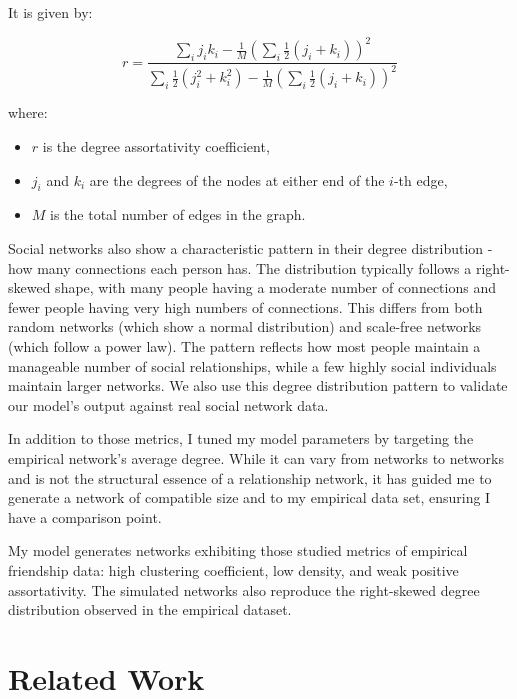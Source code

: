\documentclass[runningheads]{llncs}
\begin{document}
It is given by:

\begin{equation}
r = \frac{\sum_{i} j_i k_i - \frac{1}{M} \left( \sum_{i} \frac{1}{2} (j_i + k_i) \right)^2}{\sum_{i} \frac{1}{2} (j_i^2 + k_i^2) - \frac{1}{M} \left( \sum_{i} \frac{1}{2} (j_i + k_i) \right)^2}
\label{eq:degree_assortativity}
\end{equation}

where:
\begin{itemize}
    \item $r$ is the degree assortativity coefficient,
    \item $j_i$ and $k_i$ are the degrees of the nodes at either end of the $i$-th edge,
    \item $M$ is the total number of edges in the graph.
\end{itemize}


Social networks also show a characteristic pattern in their degree distribution - how many connections each person has. The distribution typically follows a right-skewed shape, with many people having a moderate number of connections and fewer people having very high numbers of connections. This differs from both random networks (which show a normal distribution) and scale-free networks (which follow a power law). The pattern reflects how most people maintain a manageable number of social relationships, while a few highly social individuals maintain larger networks.
We also use this degree distribution pattern to validate our model's output against real social network data.

In addition to those metrics,
I tuned my model parameters by targeting the empirical network's average degree. While it can vary from networks to networks and is not the structural essence of a relationship network, it has guided me to generate a network of compatible size and to my empirical data set, ensuring I have a comparison point.

My model generates networks exhibiting those studied metrics of empirical friendship data: high clustering coefficient, low density, and weak positive assortativity. The simulated networks also reproduce the right-skewed degree distribution observed in the empirical dataset.


\section{Related Work}
\end{document}
